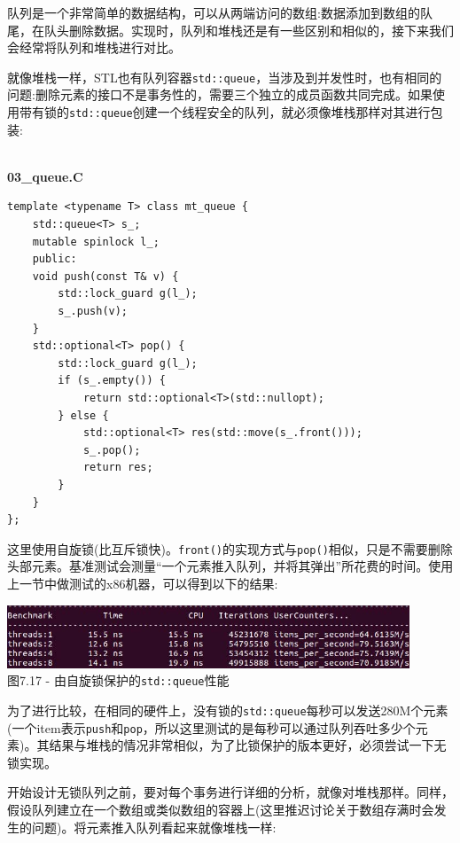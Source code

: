 
队列是一个非常简单的数据结构，可以从两端访问的数组:数据添加到数组的队尾，在队头删除数据。实现时，队列和堆栈还是有一些区别和相似的，接下来我们会经常将队列和堆栈进行对比。

就像堆栈一样，STL也有队列容器\texttt{std::queue}，当涉及到并发性时，也有相同的问题:删除元素的接口不是事务性的，需要三个独立的成员函数共同完成。如果使用带有锁的\texttt{std::queue}创建一个线程安全的队列，就必须像堆栈那样对其进行包装:

\hspace*{\fill} \\ %
\noindent
\textbf{03\_queue.C}
\begin{lstlisting}[style=styleCXX]
template <typename T> class mt_queue {
	std::queue<T> s_;
	mutable spinlock l_;
	public:
	void push(const T& v) {
		std::lock_guard g(l_);
		s_.push(v);
	}
	std::optional<T> pop() {
		std::lock_guard g(l_);
		if (s_.empty()) {
			return std::optional<T>(std::nullopt);
		} else {
			std::optional<T> res(std::move(s_.front()));
			s_.pop();
			return res;
		}
	}
};
\end{lstlisting}

这里使用自旋锁(比互斥锁快)。\texttt{front()}的实现方式与\texttt{pop()}相似，只是不需要删除头部元素。基准测试会测量“一个元素推入队列，并将其弹出”所花费的时间。使用上一节中做测试的x86机器，可以得到以下的结果:

\begin{center}
\includegraphics[width=0.9\textwidth]{content/2/chapter7/images/17.jpg}\\
图7.17 - 由自旋锁保护的\texttt{std::queue}性能
\end{center}

为了进行比较，在相同的硬件上，没有锁的\texttt{std::queue}每秒可以发送280M个元素(一个item表示\texttt{push}和\texttt{pop}，所以这里测试的是每秒可以通过队列吞吐多少个元素)。其结果与堆栈的情况非常相似，为了比锁保护的版本更好，必须尝试一下无锁实现。


开始设计无锁队列之前，要对每个事务进行详细的分析，就像对堆栈那样。同样，假设队列建立在一个数组或类似数组的容器上(这里推迟讨论关于数组存满时会发生的问题)。将元素推入队列看起来就像堆栈一样:


